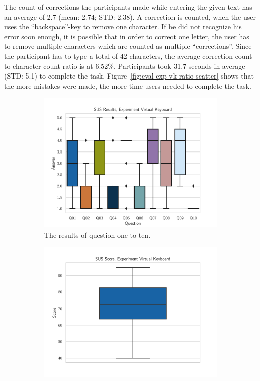 The count of corrections the participants made while entering the given text has an average of 2.7 (mean: 2.74; \ac{STD}: 2.38). A correction is counted, when the user uses the \enquote{backspace}-key to remove one character. If he did not recognize his error soon enough, it is possible that in order to correct one letter, the user has to remove multiple characters which are counted as multiple \enquote{corrections}. Since the participant has to type a total of 42 characters, the average correction count to character count ratio is at 6.52\%.
Participants took 31.7 seconds in average (\ac{STD}: 5.1) to complete the task. Figure~\ref{fig:eval-exp-vk-ratio-scatter} shows that the more mistakes were made, the more time users needed to complete the task.

\begin{figure}[H]
  \centering
  \begin{subfigure}{.5\linewidth}%
    \centering
    \includegraphics[width=\linewidth]{figures/evaluation/res_exp_vk.pdf}
    \caption{The results of question one to ten.}\label{fig:res-exp-vk}
  \end{subfigure}%
  \begin{subfigure}{.5\linewidth}%
    \centering
    \includegraphics[width=\linewidth]{figures/evaluation/score_exp_vk.pdf}

\end{subfigure}
\end{figure}
